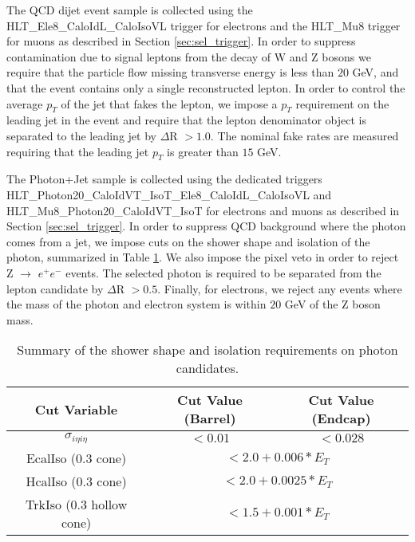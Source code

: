 The QCD dijet event sample is collected using the {HLT\_Ele8\_CaloIdL\_CaloIsoVL } 
trigger for electrons and the { HLT\_Mu8 } trigger for muons as described 
in Section \ref{sec:sel_trigger}. In order to suppress 
contamination due to signal leptons from the decay of W and Z bosons we require
that the particle flow missing transverse energy is less than $20$ GeV, and that 
the event contains only a single reconstructed lepton. In order to control the 
average $p_{T}$ of the jet that fakes the lepton, we impose a $p_{T}$ requirement 
on the leading jet in the event and require that the lepton denominator object is 
separated to the leading jet by $\Delta$R $ > 1.0$. The nominal fake rates are measured
requiring that the leading jet $p_{T}$ is greater than $15$ GeV. 

The Photon+Jet sample is collected using the dedicated triggers \\
{HLT\_Photon20\_CaloIdVT\_IsoT\_Ele8\_CaloIdL\_CaloIsoVL} and 
{HLT\_Mu8\_Photon20\_CaloIdVT\_IsoT} for electrons and muons
as described in Section \ref{sec:sel_trigger}.
In order to suppress QCD background where the photon comes from a 
jet, we impose cuts on the shower shape and isolation of the photon, 
summarized in Table \ref{tab:photonOfflineSelection}. We also impose the pixel veto in order to reject
Z $\rightarrow$ $e^{+}e^{-}$ events. The selected photon is required to
be separated from the lepton candidate by $\Delta$R $ > 0.5$. Finally, 
for electrons, we reject any events where the mass of the photon and
electron system is within $20$ GeV of the Z boson mass. 

\begin{table}[!ht]
\begin{center}
\begin{tabular}{|c|c|c|}
\hline
 Cut Variable           &   Cut Value (Barrel)        & Cut Value (Endcap)     \\
\hline
 $\sigma_{i\eta i\eta}$      &   $<0.01$              & $<0.028$               \\ 
\hline
 EcalIso (0.3 cone)          &   \multicolumn{2}{|c|}{$<2.0 + 0.006*E_{T}$}    \\ 
 HcalIso (0.3 cone)          &   \multicolumn{2}{|c|}{$<2.0 + 0.0025*E_{T}$}   \\ 
 TrkIso (0.3 hollow cone)    &   \multicolumn{2}{|c|}{$<1.5 + 0.001*E_{T}$}    \\ 
\hline
\end{tabular}
\caption{Summary of the shower shape and isolation requirements on 
photon candidates. \label{tab:photonOfflineSelection}}
\end{center}
\end{table}

